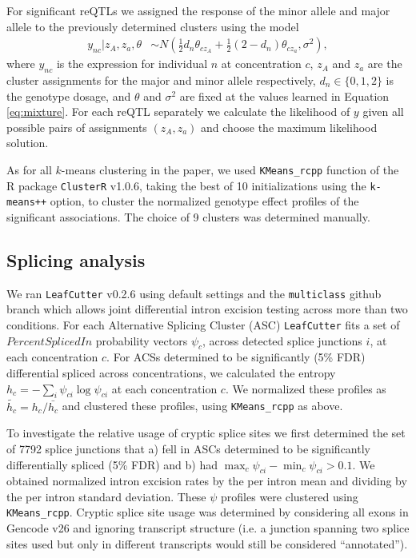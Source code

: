 \documentclass{article}
\begin{document}
For significant reQTLs we assigned the response of the minor allele and major allele to the previously determined clusters using the model
\begin{align*}
y_{nc} | z_A,z_a, \theta &\sim N\left( \frac12 d_n \theta_{cz_A} + \frac12 (2 - d_n) \theta_{cz_a}, \sigma^2 \right),
\end{align*}
where $y_{nc}$ is the expression for individual $n$ at concentration $c$, $z_A$ and $z_a$ are the cluster assignments for the major and minor allele respectively, $d_n \in \{0,1,2\}$ is the genotype dosage, and $\theta$ and $\sigma^2$ are fixed at the values learned in Equation \ref{eq:mixture}. For each reQTL separately we calculate the likelihood of $y$ given all possible pairs of assignments $(z_A,z_a)$ and choose the maximum likelihood solution. 

As for all $k$-means clustering in the paper, we used \texttt{KMeans\_rcpp} function of the R package \texttt{ClusterR} v1.0.6, taking the best of 10 initializations using the \texttt{k-means++} option, to cluster the normalized genotype effect profiles of the significant associations. The choice of 9 clusters was determined manually. 

\subsection*{Splicing analysis}

We ran \texttt{LeafCutter} v0.2.6 using default settings and the \texttt{multiclass} github branch which allows joint differential intron excision testing across more than two conditions. For each Alternative Splicing Cluster (ASC) \texttt{LeafCutter} fits a set of $Percent Spliced In$ probability vectors $\psi_{c}$, across detected splice junctions $i$, at each concentration $c$. For ACSs determined to be significantly (5\% FDR) differential spliced across concentrations, we calculated the entropy $h_c = -\sum_i \psi_{ci} \log \psi_{ci}$ at each concentration $c$. We normalized these profiles as $\tilde{h_c} = h_c / \bar{h_c}$ and clustered these profiles, using \texttt{KMeans\_rcpp} as above. 

To investigate the relative usage of cryptic splice sites we first determined the set of 7792 splice junctions that a) fell in ASCs determined to be significantly differentially spliced (5\% FDR) and b) had $\max_c \psi_{ci} - \min_c \psi_{ci} > 0.1$. We obtained normalized intron excision rates by the per intron mean and dividing by the per intron standard deviation. These $\psi$ profiles were clustered using \texttt{KMeans\_rcpp}. Cryptic splice site usage was determined by considering all exons in Gencode v26 and ignoring transcript structure (i.e. a junction spanning two splice sites used but only in different transcripts would still be considered ``annotated''). 
\end{document}
